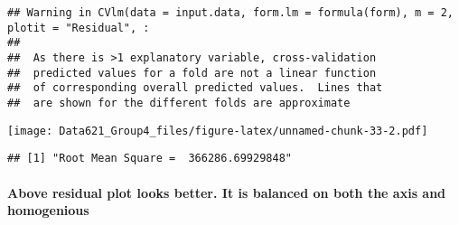 \documentclass[]{article}
\newenvironment{Shaded}{\begin{snugshade}}{\end{snugshade}}
\newcommand{\KeywordTok}[1]{\textcolor[rgb]{0.13,0.29,0.53}{\textbf{#1}}}
\newcommand{\NormalTok}[1]{#1}
\newcommand{\OperatorTok}[1]{\textcolor[rgb]{0.81,0.36,0.00}{\textbf{#1}}}
\newcommand{\StringTok}[1]{\textcolor[rgb]{0.31,0.60,0.02}{#1}}
\let\oldparagraph\paragraph
\renewcommand{\paragraph}[1]{\oldparagraph{#1}\mbox{}}
\begin{document}
\begin{verbatim}
## Warning in CVlm(data = input.data, form.lm = formula(form), m = 2, plotit = "Residual", : 
## 
##  As there is >1 explanatory variable, cross-validation
##  predicted values for a fold are not a linear function
##  of corresponding overall predicted values.  Lines that
##  are shown for the different folds are approximate
\end{verbatim}

\texttt{[image: Data621\_Group4\_files/figure-latex/unnamed-chunk-33-2.pdf]}

\begin{Shaded}
\end{Shaded}

\begin{verbatim}
## [1] "Root Mean Square =  366286.69929848"
\end{verbatim}

\hypertarget{above-residual-plot-looks-better.-it-is-balanced-on-both-the-axis-and-homogenious}{%
\paragraph{Above residual plot looks better. It is balanced on both the
axis and
homogenious}\label{above-residual-plot-looks-better.-it-is-balanced-on-both-the-axis-and-homogenious}}
\end{document}
